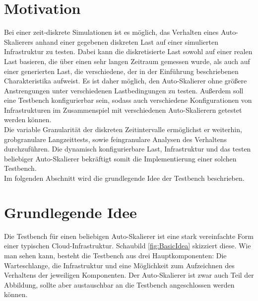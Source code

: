 \section{Motivation}
\label{sec:Introduction:Motivation}
Bei einer zeit-diskrete Simulationen ist es möglich, das Verhalten eines Auto-Skalierers anhand einer gegebenen diskreten Last auf einer simulierten Infrastruktur zu testen. Dabei kann die diskretisierte Last sowohl auf einer realen Last basieren, die über einen sehr langen Zeitraum gemessen wurde, als auch auf einer generierten Last, die verschiedene, der in der Einführung beschriebenen Charakteristika aufweist. Es ist daher möglich, den Auto-Skalierer ohne größere Anstrengungen unter verschiedenen Lastbedingungen zu testen. Außerdem soll eine Testbench konfigurierbar sein, sodass auch verschiedene Konfigurationen von Infrastrukturen im Zusammenspiel mit verschiedenen Auto-Skalierern getestet werden können.\\
Die variable Granularität der diskreten Zeitintervalle ermöglichst er weiterhin, grobgranulare Langzeittests, sowie feingranulare Analysen des Verhaltens durchzuführen. Die dynamisch konfigurierbare Last, Infrastruktur und das testen beliebiger Auto-Skalierer bekräftigt somit die Implementierung einer solchen Testbench. \\
Im folgenden Abschnitt wird die grundlegende Idee der Testbench beschrieben.




\section{Grundlegende Idee}

Die Testbench für einen beliebigen Auto-Skalierer ist eine stark vereinfachte Form einer typischen Cloud-Infrastruktur. Schaubild \ref{fig:BasicIdea} skizziert diese. Wie man sehen kann, besteht die Testbench aus drei Hauptkomponenten: Die Warteschlange, die Infrastruktur und eine Möglichkeit zum Aufzeichnen des Verhaltens der jeweiligen Komponenten. Der Auto-Skalierer ist zwar auch Teil der Abbildung, sollte aber austauschbar an die Testbench angeschlossen werden können. \\






